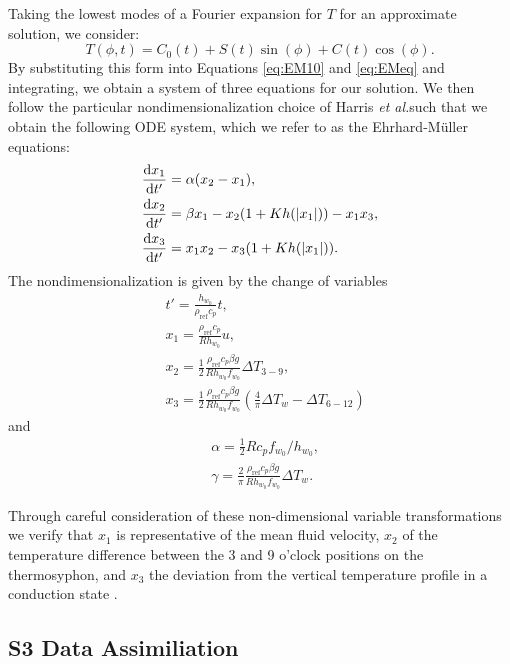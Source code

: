 \documentclass[10pt,letterpaper]{article}
\newcommand{\etal}{\textit{et al.}}
\newcommand{\diff}[2]{\frac{{\rm d}#1}{{\rm d}#2}}
\newcommand{\rhoref}{\rho_{\text{ref}}}
\begin{document}
Taking the lowest modes of a Fourier expansion for $T$ for an approximate solution, we consider:
\begin{equation} T(\phi , t) = C_0 (t) + S(t) \sin (\phi ) + C(t) \cos (\phi) . \end{equation}
By substituting this form into Equations \ref{eq:EM10} and \ref{eq:EMeq} and integrating, we obtain a system of three equations for our solution.
We then follow the particular nondimensionalization choice of Harris \etal such that we obtain the following ODE system, which we refer to as the Ehrhard-M\"{u}ller equations:
\begin{align}
& \diff{x_1}{t'} = \alpha (x_2 - x_1),\\
& \diff{x_2}{t'} = \beta x_1 - x_2 (1 + Kh(|x_1|)) - x_1x_3,\\
& \diff{x_3}{t'} = x_1x_2 - x_3 (1 + Kh(|x_1|)) .\end{align}
The nondimensionalization is given by the change of variables
\begin{align}
& t' = \frac{h_{w_0}}{\rhoref c_p}t,\\
& x_1 = \frac{\rhoref c_p }{R h_{w_0}} u, \\
& x_2 = \frac{1}{2} \frac{\rhoref c_p \beta g}{ R h_{w_0} f_{w_0}} \Delta T_{3-9}, \\
& x_3 = \frac{1}{2} \frac{\rhoref c_p \beta g}{ R h_{w_0} f_{w_0}} \left ( \frac{4}{\pi} \Delta T_w - \Delta T_{6-12} \right ) 
\end{align}
and
\begin{align}
& \alpha = \frac{1}{2} R c_p f_{w_0} / h_{w_0} ,\\
& \gamma = \frac{2}{\pi} \frac{\rhoref c_p \beta g}{Rh_{w_0} f_{w_0}} \Delta T_w. \end{align}

Through careful consideration of these non-dimensional variable transformations we verify that $x_1$ is representative of the mean fluid velocity, $x_2$ of the temperature difference between the 3 and 9 o'clock positions on the thermosyphon, and $x_3$ the deviation from the vertical temperature profile in a conduction state \cite{harris2011predicting}.

\clearpage
\pagebreak
\subsection*{S3 Data Assimiliation}
\label{S3}
\end{document}
